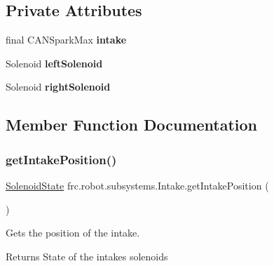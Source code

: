 \subsection*{Private Attributes}
\begin{DoxyCompactItemize}
\item 
\mbox{\label{classfrc_1_1robot_1_1subsystems_1_1_intake_a093008ca1c6c3cbd68f83eb952e3808e}} 
final C\+A\+N\+Spark\+Max {\bfseries intake}
\item 
\mbox{\label{classfrc_1_1robot_1_1subsystems_1_1_intake_afb131c71122c2968566a990aec3529d1}} 
Solenoid {\bfseries left\+Solenoid}
\item 
\mbox{\label{classfrc_1_1robot_1_1subsystems_1_1_intake_a381951329b23a816ed1e4769f8578747}} 
Solenoid {\bfseries right\+Solenoid}
\end{DoxyCompactItemize}


\subsection{Member Function Documentation}
\mbox{\label{classfrc_1_1robot_1_1subsystems_1_1_intake_a485144b4bbb9087a23b03d260d44a1e6}} 
\subsubsection{\texorpdfstring{getIntakePosition()}{getIntakePosition()}}
{\footnotesize\ttfamily \mbox{\hyperlink{enumfrc_1_1robot_1_1enums_1_1_solenoid_state}{Solenoid\+State}} frc.\+robot.\+subsystems.\+Intake.\+get\+Intake\+Position (\begin{DoxyParamCaption}{ }\end{DoxyParamCaption})\hspace{0.3cm}{\ttfamily [inline]}}



Gets the position of the intake. 

\begin{DoxyReturn}{Returns}
State of the intake\textquotesingle{}s solenoids 
\end{DoxyReturn}
\mbox{\label{classfrc_1_1robot_1_1subsystems_1_1_intake_a2d6ff9d70f7fdb3d7eb4d8f697015024}} 

